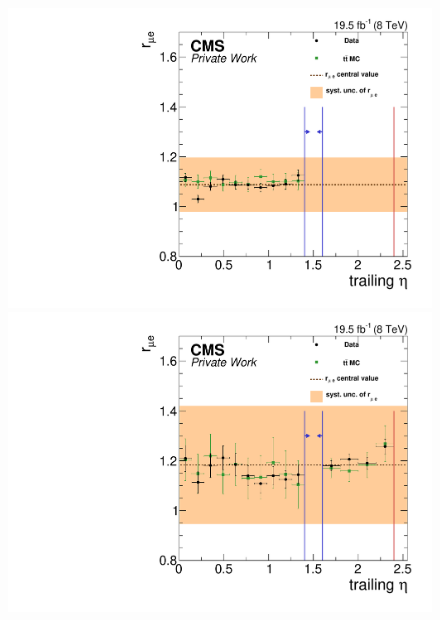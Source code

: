 \begin{figure}[htbp]
\centering
\begin{minipage}[t]{0.49\textwidth}
  \includegraphics[width=\textwidth]{plots/BG/rmue/rMuE_ZPeakControlCentral_Full2012_TrailingEta_None.pdf}
\end{minipage}
\begin{minipage}[t]{0.49\textwidth}
\includegraphics[width=\textwidth]{plots/BG/rmue/rMuE_ZPeakControlForward_Full2012_TrailingEta_None.pdf}
\end{minipage}
\begin{minipage}[t]{0.49\textwidth}

\end{minipage}
\end{figure}
